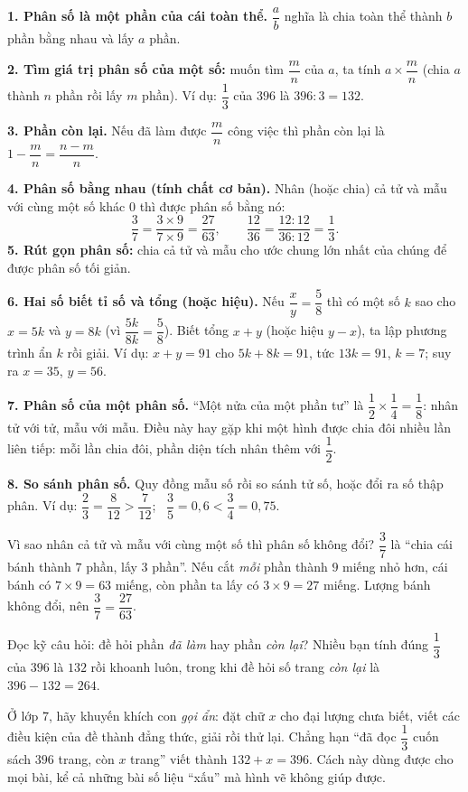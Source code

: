 \begin{knowbox}
\textbf{1. Phân số là một phần của cái toàn thể.} $\dfrac{a}{b}$ nghĩa là chia toàn thể thành $b$ phần bằng nhau
và lấy $a$ phần.

\textbf{2. Tìm giá trị phân số của một số:} muốn tìm $\dfrac{m}{n}$ của $a$, ta tính $a \times \dfrac{m}{n}$
(chia $a$ thành $n$ phần rồi lấy $m$ phần). Ví dụ: $\dfrac{1}{3}$ của $396$ là $396 : 3 = 132$.

\textbf{3. Phần còn lại.} Nếu đã làm được $\dfrac{m}{n}$ công việc thì phần còn lại là $1 - \dfrac{m}{n} = \dfrac{n-m}{n}$.

\textbf{4. Phân số bằng nhau (tính chất cơ bản).} Nhân (hoặc chia) cả tử và mẫu với cùng một số khác $0$ thì được
phân số bằng nó:
\[ \frac{3}{7} = \frac{3\times 9}{7\times 9} = \frac{27}{63}, \qquad \frac{12}{36} = \frac{12:12}{36:12} = \frac{1}{3}. \]
\textbf{5. Rút gọn phân số:} chia cả tử và mẫu cho ước chung lớn nhất của chúng để được phân số tối giản.

\textbf{6. Hai số biết tỉ số và tổng (hoặc hiệu).} Nếu $\dfrac{x}{y} = \dfrac{5}{8}$ thì có một số $k$ sao cho
$x = 5k$ và $y = 8k$ (vì $\dfrac{5k}{8k} = \dfrac58$). Biết tổng $x + y$ (hoặc hiệu $y - x$), ta lập phương trình
ẩn $k$ rồi giải. Ví dụ: $x + y = 91$ cho $5k + 8k = 91$, tức $13k = 91$, $k = 7$; suy ra $x = 35$, $y = 56$.

\textbf{7. Phân số của một phân số.} ``Một nửa của một phần tư'' là $\dfrac12\times\dfrac14 = \dfrac18$: nhân tử với tử,
mẫu với mẫu. Điều này hay gặp khi một hình được chia đôi nhiều lần liên tiếp: mỗi lần chia đôi, phần diện tích nhân thêm
với $\dfrac12$.

\textbf{8. So sánh phân số.} Quy đồng mẫu số rồi so sánh tử số, hoặc đổi ra số thập phân. Ví dụ:
$\dfrac23 = \dfrac{8}{12} > \dfrac{7}{12}$; \ $\dfrac35 = 0{,}6 < \dfrac34 = 0{,}75$.
\end{knowbox}
\begin{proofbox}
Vì sao nhân cả tử và mẫu với cùng một số thì phân số không đổi? $\dfrac{3}{7}$ là ``chia cái bánh thành $7$ phần,
lấy $3$ phần''. Nếu cắt \emph{mỗi} phần thành $9$ miếng nhỏ hơn, cái bánh có $7\times 9 = 63$ miếng, còn phần ta lấy
có $3\times 9 = 27$ miếng. Lượng bánh không đổi, nên $\dfrac{3}{7} = \dfrac{27}{63}$.
\end{proofbox}
\begin{warnbox}
Đọc kỹ câu hỏi: đề hỏi phần \emph{đã làm} hay phần \emph{còn lại}? Nhiều bạn tính đúng $\dfrac13$ của $396$ là $132$
rồi khoanh luôn, trong khi đề hỏi số trang \emph{còn lại} là $396 - 132 = 264$.
\end{warnbox}
\begin{parentbox}
Ở lớp 7, hãy khuyến khích con \emph{gọi ẩn}: đặt chữ $x$ cho đại lượng chưa biết, viết các điều kiện của đề thành
đẳng thức, giải rồi thử lại. Chẳng hạn ``đã đọc $\dfrac13$ cuốn sách $396$ trang, còn $x$ trang'' viết thành
$132 + x = 396$. Cách này dùng được cho mọi bài, kể cả những bài số liệu ``xấu'' mà hình vẽ không giúp được.
\end{parentbox}

